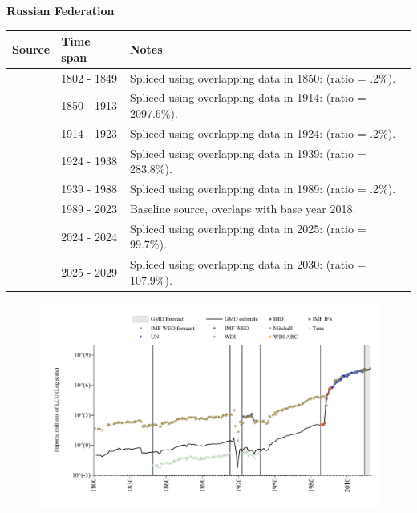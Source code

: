 \documentclass[12pt,a4paper,landscape]{article}
\begin{document}
\begin{adjustbox}{max totalsize={\paperwidth}{\paperheight},center}
\begin{minipage}[t][\textheight][t]{\textwidth}
\vspace*{0.5cm}
{}
\begin{center}
{\Large\bfseries Russian Federation}
\end{center}
\vspace{0.5cm}
\begin{table}[H]
\centering
\small
\begin{tabular}{|l|l|l|}
\hline
\textbf{Source} & \textbf{Time span} & \textbf{Notes} \\
\hline
\rowcolor{white}\cite{Mitchell}& 1802 - 1849 &Spliced using overlapping data in 1850: (ratio = .2\%).\\
\rowcolor{lightgray}\cite{Tena}& 1850 - 1913 &Spliced using overlapping data in 1914: (ratio = 2097.6\%).\\
\rowcolor{white}\cite{Mitchell}& 1914 - 1923 &Spliced using overlapping data in 1924: (ratio = .2\%).\\
\rowcolor{lightgray}\cite{Tena}& 1924 - 1938 &Spliced using overlapping data in 1939: (ratio = 283.8\%).\\
\rowcolor{white}\cite{Mitchell}& 1939 - 1988 &Spliced using overlapping data in 1989: (ratio = .2\%).\\
\rowcolor{lightgray}\cite{WDI}& 1989 - 2023 &Baseline source, overlaps with base year 2018.\\
\rowcolor{white}\cite{IMF_IFS}& 2024 - 2024 &Spliced using overlapping data in 2025: (ratio = 99.7\%).\\
\rowcolor{lightgray}\cite{IMF_WEO_forecast}& 2025 - 2029 &Spliced using overlapping data in 2030: (ratio = 107.9\%).\\
\hline
\end{tabular}
\end{table}
\begin{figure}[H]
\centering
\includegraphics[width=\textwidth,height=0.6\textheight,keepaspectratio]{graphs/RUS_imports.pdf}
\end{figure}
\end{minipage}
\end{adjustbox}
\end{document}
